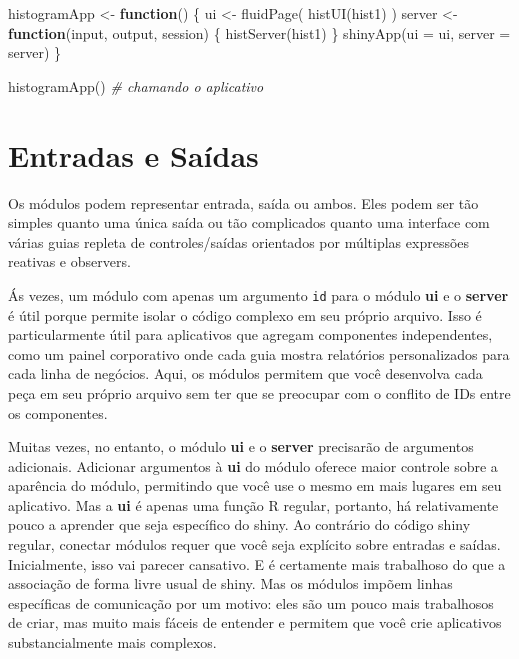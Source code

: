 \documentclass[
]{book}
\newenvironment{Shaded}{\begin{snugshade}}{\end{snugshade}}
\newcommand{\AttributeTok}[1]{\textcolor[rgb]{0.77,0.63,0.00}{#1}}
\newcommand{\CommentTok}[1]{\textcolor[rgb]{0.56,0.35,0.01}{\textit{#1}}}
\newcommand{\ControlFlowTok}[1]{\textcolor[rgb]{0.13,0.29,0.53}{\textbf{#1}}}
\newcommand{\FunctionTok}[1]{\textcolor[rgb]{0.00,0.00,0.00}{#1}}
\newcommand{\NormalTok}[1]{#1}
\newcommand{\OtherTok}[1]{\textcolor[rgb]{0.56,0.35,0.01}{#1}}
\newcommand{\StringTok}[1]{\textcolor[rgb]{0.31,0.60,0.02}{#1}}
\begin{document}
\begin{Shaded}
\begin{Highlighting}[]
\NormalTok{histogramApp }\OtherTok{\textless{}{-}} \ControlFlowTok{function}\NormalTok{() \{}
\NormalTok{  ui }\OtherTok{\textless{}{-}} \FunctionTok{fluidPage}\NormalTok{(}
    \FunctionTok{histUI}\NormalTok{(}\StringTok{\textquotesingle{}hist1\textquotesingle{}}\NormalTok{)}
\NormalTok{  )}
\NormalTok{  server }\OtherTok{\textless{}{-}} \ControlFlowTok{function}\NormalTok{(input, output, session) \{}
    \FunctionTok{histServer}\NormalTok{(}\StringTok{\textquotesingle{}hist1\textquotesingle{}}\NormalTok{)}
\NormalTok{  \}}
  \FunctionTok{shinyApp}\NormalTok{(}\AttributeTok{ui =}\NormalTok{ ui, }\AttributeTok{server =}\NormalTok{ server)  }
\NormalTok{\}}

\FunctionTok{histogramApp}\NormalTok{() }\CommentTok{\# chamando o aplicativo}
\end{Highlighting}
\end{Shaded}

\hypertarget{entradas-e-sauxeddas}{%
\section{\texorpdfstring{\textbf{Entradas e Saídas}}{Entradas e Saídas}}\label{entradas-e-sauxeddas}}

Os módulos podem representar entrada, saída ou ambos. Eles podem ser tão simples quanto uma única saída ou tão complicados quanto uma interface com várias guias repleta de controles/saídas orientados por múltiplas expressões reativas e observers.

Ás vezes, um módulo com apenas um argumento \texttt{id} para o módulo \textbf{ui} e o \textbf{server} é útil porque permite isolar o código complexo em seu próprio arquivo. Isso é particularmente útil para aplicativos que agregam componentes independentes, como um painel corporativo onde cada guia mostra relatórios personalizados para cada linha de negócios. Aqui, os módulos permitem que você desenvolva cada peça em seu próprio arquivo sem ter que se preocupar com o conflito de IDs entre os componentes.

Muitas vezes, no entanto, o módulo \textbf{ui} e o \textbf{server} precisarão de argumentos adicionais. Adicionar argumentos à \textbf{ui} do módulo oferece maior controle sobre a aparência do módulo, permitindo que você use o mesmo em mais lugares em seu aplicativo. Mas a \textbf{ui} é apenas uma função R regular, portanto, há relativamente pouco a aprender que seja específico do shiny. Ao contrário do código shiny regular, conectar módulos requer que você seja explícito sobre entradas e saídas. Inicialmente, isso vai parecer cansativo. E é certamente mais trabalhoso do que a associação de forma livre usual de shiny. Mas os módulos impõem linhas específicas de comunicação por um motivo: eles são um pouco mais trabalhosos de criar, mas muito mais fáceis de entender e permitem que você crie aplicativos substancialmente mais complexos.
\end{document}
